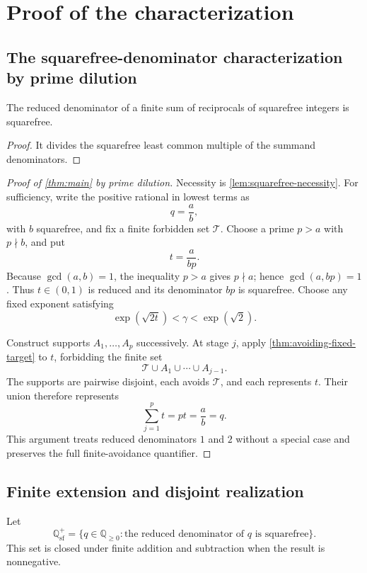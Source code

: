 \section{Proof of the characterization}
\label{sec:characterization-proof}

\subsection{The squarefree-denominator characterization by prime dilution}

\begin{lemma}
\label{lem:squarefree-necessity}
The reduced denominator of a finite sum of reciprocals of squarefree integers is squarefree.
\end{lemma}

\begin{proof}
It divides the squarefree least common multiple of the summand denominators.
\end{proof}

\begin{proof}[Proof of \cref{thm:main} by prime dilution]
Necessity is \cref{lem:squarefree-necessity}.  For sufficiency, write the positive rational in lowest terms as
\[
 q=\frac ab,
\]
with $b$ squarefree, and fix a finite forbidden set $\mathcal T$.  Choose a prime $p>a$ with $p\nmid b$, and put
\[
 t=\frac{a}{bp}.
\]
Because $\gcd(a,b)=1$, the inequality $p>a$ gives $p\nmid a$; hence $\gcd(a,bp)=1$.  Thus $t\in(0,1)$ is reduced and its denominator $bp$ is squarefree.  Choose any fixed exponent satisfying
\[
 \exp(\sqrt{2t})<\gamma<\exp(\sqrt2).
\]

Construct supports $A_1,\ldots,A_p$ successively.  At stage $j$, apply \cref{thm:avoiding-fixed-target} to $t$, forbidding the finite set
\[
 \mathcal T\cup A_1\cup\cdots\cup A_{j-1}.
\]
The supports are pairwise disjoint, each avoids $\mathcal T$, and each represents $t$.  Their union therefore represents
\[
 \sum_{j=1}^p t=pt=\frac ab=q.
\]
This argument treats reduced denominators $1$ and $2$ without a special case and preserves the full finite-avoidance quantifier.
\end{proof}

\subsection{Finite extension and disjoint realization}

Let
\[
 \mathbb Q_{\mathrm{sf}}^+
 =\{q\in\mathbb Q_{\geq0}:\text{the reduced denominator of $q$ is squarefree}\}.
\]
This set is closed under finite addition and subtraction when the result is nonnegative.

